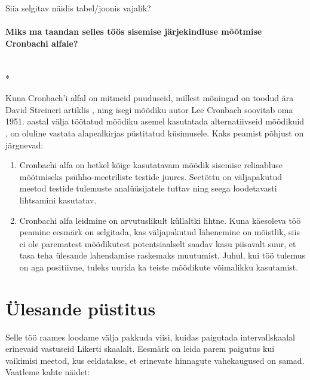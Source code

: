 \documentclass[a4paper,12pt]{article}
\numberwithin{equation}{section}
\theoremstyle{definition}
\begin{document}
{\color{cyan} Siia selgitav näidis tabel/joonis vajalik?}


\paragraph{Miks ma taandan selles töös sisemise järjekindluse mõõtmise Cronbachi alfale?}\mbox{}\\*

Kuna Cronbach'i alfal on mitmeid puuduseid, millest mõningad on toodud ära David Streineri artiklis \cite[101-102]{Streiner2010}, ning isegi mõõdiku autor Lee Cronbach soovitab oma 1951. aastal välja töötatud mõõdiku asemel kasutatada alternatiivseid mõõdikuid \cite{Cronbach2004}, on oluline vastata alapealkirjas p\"ustitatud k\"usimusele. Kaks peamist põhjust on järgnevad:
\begin{enumerate}[I]
\item Cronbachi alfa on hetkel kõige kasutatavam mõõdik sisemise reliaabluse mõõtmiseks ps\"uhho-meetriliste testide juures. Seetõttu on väljapakutud meetod testide tulemuste anal\"u\"usijatele tuttav ning seega loodetavasti lihtsamini kasutatav.
\item Cronbachi alfa leidmine on arvutuslikult k\"ullaltki lihtne. Kuna käesoleva töö peamine eesmärk on selgitada, kas väljapakutud lähenemine on mõistlik, siis ei ole parematest mõõdikutest potentsiaalselt saadav kasu piisavalt suur, et tasa teha \"ulesande lahendamise raskemaks muutumist. Juhul, kui töö tulemus on aga positiivne,  tuleks uurida ka teiste mõõdikute võimalikku kasutamist.

\end{enumerate}










\section{\"Ulesande p\"ustitus}

Selle töö raames loodame välja pakkuda viisi, kuidas paigutada intervallskaalal erinevaid vastuseid Likerti skaalalt. Eesmärk on leida parem paigutus kui vaikimisi meetod, kus eeldatakse, et erinevate hinnagute vahekaugused on samad. Vaatleme kahte näidet:
\end{document}
